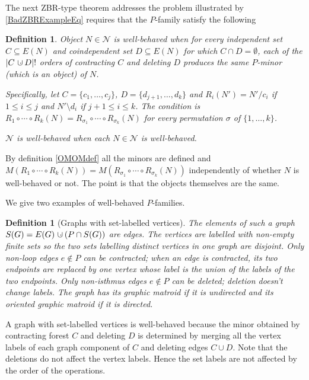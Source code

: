 \documentclass[12pt,leqno]{amsart}
\newtheorem{definition}[lem]{Definition}
\theoremstyle{remark}
\newcommand{\dunion}
{\mbox{\hbox{\hskip6pt$\cdot$\hskip-5.50pt$\cup$\hskip2pt}}}
\begin{document}
The next ZBR-type theorem  addresses the problem 
illustrated by \eqref{BadZBRExampleEq} requires that
the $P$-family satisfy the following

\begin{definition}
Object $N\in\mathcal{N}$ is \emph{well-behaved} when
for every independent set $C\subseteq E(N)$ and
coindependent set $D\subseteq E(N)$ for which
$C\cap D=\emptyset$, each of the
$|C\dunion D|!$ orders 
of contracting $C$ and deleting $D$ produces the
same $P$-minor (which is an object) of $N$.

Specifically, let 
$C=\{c_1,\ldots,c_j\}$,
$D=\{d_{j+1},\ldots,d_k\}$
and $R_i(N')=N'/c_i$ if $1\le i \le j$
and $N'\setminus d_i$ if $j+1\le i \le k$.
The condition is 
$R_1\circ\cdots\circ R_k(N) = R_{\sigma_1}\circ\cdots\circ R_{\sigma_k}(N)$
for every permutation $\sigma$ of $\{1,\ldots,k\}$.

$\mathcal{N}$ is \emph{well-behaved} when 
each $N\in\mathcal{N}$ is well-behaved.

\end{definition}

By definition \ref{OMOMdef} 
all the minors are defined and
$M(R_1\circ\cdots\circ R_k(N)) = M(R_{\sigma_1}\circ\cdots\circ R_{\sigma_k}(N))$
independently of whether $N$ is well-behaved or not.
The point is that the objects themselves are the same.

We give two examples of well-behaved $P$-families.

\begin{definition}[Graphs with set-labelled vertices]
\label{GSLVDefinition}
The elements of such a graph $S(G)=E(G)\dunion(P\cap S(G))$ are edges.
The vertices are labelled with non-empty
finite sets so the two sets labelling distinct vertices in one
graph are disjoint.  Only non-loop edges $e\not\in P$
can be contracted; when an edge is contracted, its two endpoints
are replaced by one vertex whose label is the union of the 
labels of the two endpoints.  Only non-isthmus edges $e\not\in P$
can be deleted; deletion doesn't change labels.  The graph
has its graphic matroid if it is undirected and its
oriented graphic matroid if it is directed.
\end{definition}

A graph with set-labelled vertices is well-behaved because
the minor obtained  by contracting forest $C$
and deleting $D$ is determined by merging all the vertex labels
of each graph component of $C$ and deleting edges $C\cup D$.  Note
that the deletions do not affect the vertex labels.  Hence
the set labels are not affected by the order
of the operations.
\end{document}
